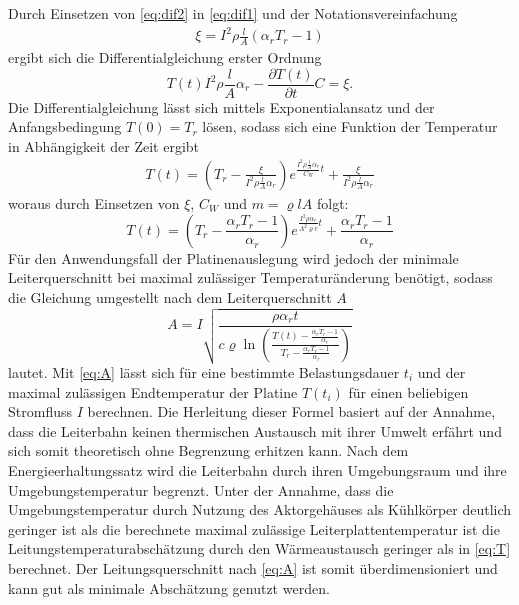 Durch Einsetzen von \autoref{eq:dif2} in \autoref{eq:dif1} und der Notationsvereinfachung
\begin{align*}
\xi = I^2 \rho \frac{l}{A}(\alpha_r T_r-1)
\end{align*}
ergibt sich die Differentialgleichung erster Ordnung
\begin{equation}
\label{eq:dT}
T(t)I^2 \rho \frac{l}{A} \alpha_r-\frac{\partial T(t)}{\partial t}C = \xi .
\end{equation}
Die Differentialgleichung lässt sich mittels Exponentialansatz und der Anfangsbedingung $T(0) = T_r$ lösen, sodass sich eine Funktion der Temperatur in Abhängigkeit der Zeit ergibt
\begin{align*}
T(t) = \left(T_r-\frac{\xi}{I^2 \rho \frac{l}{A} \alpha_r}\right)e^{\frac{I^2\rho \frac{l}{A}\alpha_r}{C_W}t}+\frac{\xi}{I^2\rho \frac{l}{A}\alpha_r}
\end{align*}
woraus durch Einsetzen von $\xi$, $C_W$ und $m = \varrho l A$ folgt:
\begin{equation}
\label{eq:T}
T(t) = \left(T_r-\frac{\alpha_rT_r-1}{\alpha_r}\right)e^{\frac{I^2\rho\alpha_r}{A^2\varrho c}t}+\frac{\alpha_r T_r-1}{\alpha_r}
\end{equation}
Für den Anwendungsfall der Platinenauslegung wird jedoch der minimale Leiterquerschnitt bei maximal zulässiger Temperaturänderung benötigt, sodass die Gleichung umgestellt nach dem Leiterquerschnitt $A$
\begin{equation}
\label{eq:A}
A = I\sqrt{\frac{\rho\alpha_r t}{c\varrho \ln{\left(\frac{T(t)-\frac{\alpha_rT_r-1}{\alpha_r}}{T_r-\frac{\alpha_rT_r-1}{\alpha_r}}\right)}}}
\end{equation}
lautet. Mit \autoref{eq:A} lässt sich für eine bestimmte Belastungsdauer $t_i$ und der maximal zulässigen Endtemperatur der Platine $T(t_i)$ für einen beliebigen Stromfluss $I$ berechnen. Die Herleitung dieser Formel basiert auf der Annahme, dass die Leiterbahn keinen thermischen Austausch mit ihrer Umwelt erfährt und sich somit theoretisch ohne Begrenzung erhitzen kann. Nach dem Energieerhaltungssatz wird die Leiterbahn durch ihren Umgebungsraum und ihre Umgebungstemperatur begrenzt. Unter der Annahme, dass die Umgebungstemperatur durch Nutzung des Aktorgehäuses als Kühlkörper deutlich geringer ist als die berechnete maximal zulässige Leiterplattentemperatur ist die Leitungstemperaturabschätzung durch den Wärmeaustausch geringer als in \autoref{eq:T} berechnet. Der Leitungsquerschnitt nach \autoref{eq:A} ist somit überdimensioniert und kann gut als minimale Abschätzung genutzt werden.
